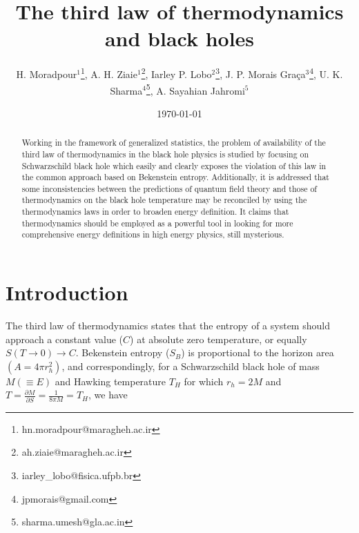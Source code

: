 \documentclass[twocolumn,preprintnumbers,amsmath,nofootinbib,amssymb]{revtex4}
\begin{document}
\title{The third law of thermodynamics and black holes}
\author{H. Moradpour$^1$\footnote{hn.moradpour@maragheh.ac.ir}, A. H. Ziaie$^1$\footnote{ah.ziaie@maragheh.ac.ir}, Iarley P. Lobo$^2$\footnote{iarley\_lobo@fisica.ufpb.br}, J. P. Morais Gra\c{c}a$^3$\footnote{jpmorais@gmail.com}, U. K. Sharma$^4$\footnote{sharma.umesh@gla.ac.in}, A. Sayahian Jahromi$^5$}
\address{$^1$ Research Institute for Astronomy and Astrophysics of Maragha
(RIAAM), University of Maragheh, P.O. Box 55136-553, Maragheh,
Iran\\
$^2$ Department of Chemistry and Physics, Federal University of Para\'iba, Rodovia BR 079 - Km 12, 58397-000 Areia-PB,  Brazil\\
$^3$ Instituto de F\'{i}sica, Universidade Federal do Rio de Janeiro, 21.941-972 - Rio de Janeiro-RJ-Brazil\\
$^4$ Department of Mathematics, Institute of Applied Sciences and
Humanities, GLA University,
    Mathura-281406, Uttar Pradesh, India\\
$^5$ Zarghan Branch, Islamic Azad University, Zarghan, Iran}
\date{\today}
\begin{abstract}
Working in the framework of generalized statistics, the problem of
availability of the third law of thermodynamics in the black hole
physics is studied by focusing on Schwarzschild black hole which
easily and clearly exposes the violation of this law in the common
approach based on Bekenstein entropy. Additionally, it is
addressed that some inconsistencies between the predictions of
quantum field theory and those of thermodynamics on the black hole
temperature may be reconciled by using the thermodynamics laws in
order to broaden energy definition. It claims that thermodynamics
should be employed as a powerful tool in looking for more
comprehensive energy definitions in high energy physics, still
mysterious.
\end{abstract}
 

\maketitle

\section{Introduction}

The third law of thermodynamics states that the entropy of a
system should approach a constant value ($C$) at absolute zero
temperature, or equally $S(T\rightarrow0)\rightarrow C$.
Bekenstein entropy ($S_B$) is proportional to the horizon area
$(A=4\pi r_h^2)$, and correspondingly, for a Schwarzschild black
hole of mass $M(\equiv E)$ and Hawking temperature $T_H$ for which
$r_h=2M$ and $T=\frac{\partial M}{\partial S}=\frac{1}{8\pi
M}=T_H$, we have
\end{document}
